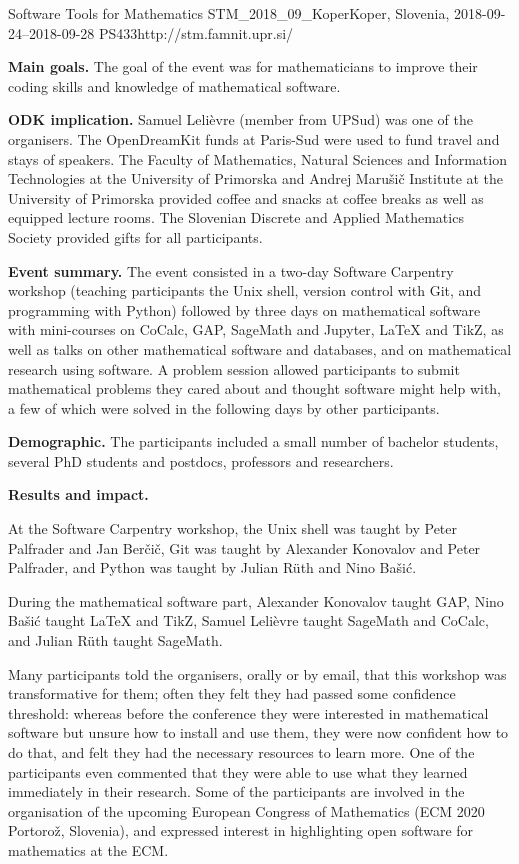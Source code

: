 \begin{event}{Software Tools for Mathematics}%
{STM_2018_09_Koper}{Koper, Slovenia, 2018-09-24--2018-09-28}%
{PS}{43}{3}{http://stm.famnit.upr.si/}

\textbf{Main goals.} The goal of the event was for mathematicians
to improve their coding skills and knowledge of mathematical software.

\textbf{ODK implication.} Samuel Lelièvre (\ODK member from UPSud) was one of
the organisers. The OpenDreamKit funds at Paris-Sud were used to fund travel
and stays of speakers.
The Faculty of Mathematics, Natural Sciences and Information Technologies at the University of Primorska
and Andrej Marušič Institute at the University of Primorska 
provided coffee and snacks at coffee breaks as well as equipped lecture rooms. 
The Slovenian Discrete and Applied Mathematics Society provided gifts for all participants.

\textbf{Event summary.} 
The event consisted in a two-day Software Carpentry
workshop (teaching participants the Unix shell, version control with Git,
and programming with Python) followed by three days on mathematical software
with mini-courses on CoCalc, GAP, SageMath and Jupyter, LaTeX and TikZ, as well
as talks on other mathematical software and databases, and on mathematical
research using software. A problem session allowed participants to submit
mathematical problems they cared about and thought software might help with,
a few of which were solved in the following days by other participants.

\textbf{Demographic.} 
The participants included a small number of bachelor students,
several PhD students and postdocs, professors and researchers.

\textbf{Results and impact.}

At the Software Carpentry workshop, 
the Unix shell was taught by Peter Palfrader and Jan Ber\v{c}i\v{c}, 
Git was taught by Alexander Konovalov and Peter Palfrader,
and Python was taught by Julian R\"{u}th and Nino Ba\v{s}i\'{c}.

During the mathematical software part,
Alexander Konovalov taught GAP,
Nino Ba\v{s}i\'{c} taught LaTeX and TikZ,
Samuel Leli\`{e}vre taught SageMath and CoCalc,
and Julian R\"{u}th taught SageMath.

Many participants told the organisers, orally or by email, that this workshop
was transformative for them; often they felt they had passed some confidence
threshold: whereas before the conference they were interested in mathematical
software but unsure how to install and use them, they were now confident how
to do that, and felt they had the necessary resources to learn more.
One of the participants even commented that they were able to use what they learned
immediately in their research.
Some of the participants are involved in the organisation of the upcoming 
European Congress of Mathematics (ECM 2020 Portoro\v{z}, Slovenia),
and expressed interest in highlighting open software for mathematics at the ECM.


\end{event}
